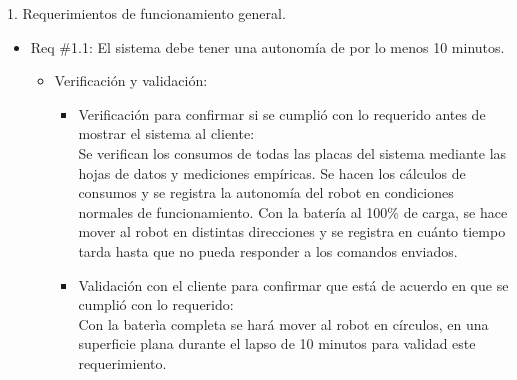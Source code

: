 \documentclass[11pt]{charter}
\begin{document}




1. Requerimientos de funcionamiento general.
\begin{itemize} 
\item Req \#1.1: El sistema debe tener una autonomía de por lo menos 10 minutos. 
\begin{itemize}
\item Verificación y validación:
	\begin{itemize}
	\item Verificación para confirmar si se cumplió con lo requerido 	antes de mostrar el sistema al cliente:\\
	Se verifican los consumos de todas las placas del sistema 				mediante las hojas de datos y mediciones empíricas. Se hacen los 	cálculos de consumos y se registra la autonomía del robot en 			condiciones normales de funcionamiento. Con la batería al 100\%
	 de carga, se hace mover al robot en distintas direcciones y se
	 registra en cuánto tiempo tarda hasta que no pueda responder a
	  los comandos enviados.
	\item Validación con el cliente para confirmar que está de 				acuerdo en que se cumplió con lo requerido:\\
	Con la baterìa completa se hará mover al robot en círculos, en 			una superficie plana durante el lapso de 10 minutos para validad 	este requerimiento.
	\end{itemize}
\end{itemize}	
\end{itemize}
\end{document}
